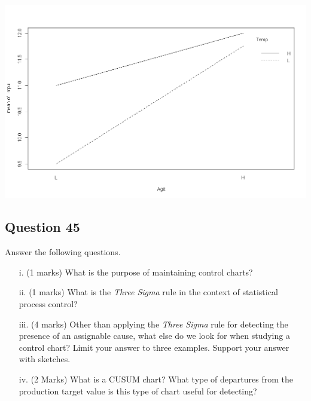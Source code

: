 \documentclass[a4paper,12pt]{article}
\begin{document}
\begin{center}
	\includegraphics[scale=0.3]{image/ExamQ6interactionc}
\end{center}

\newpage
\subsection*{Question 45}
Answer the following questions.

\begin{itemize}
	\item[i.] (1 marks) What is the purpose of maintaining control charts?
	\item[ii.] (1 marks) What is the \emph{Three Sigma} rule in the context of statistical process control?
	\item[iii.] (4 marks) Other than applying the \emph{Three Sigma} rule for detecting the presence of an assignable cause, what else do we look for when studying a control chart? Limit your answer to three examples. Support your answer with sketches.
	\item[iv.] (2 Marks) What is a CUSUM chart? What type of departures from the production target value
	is this type of chart useful for detecting?
\end{itemize}
\end{document}
